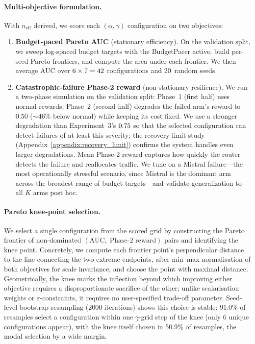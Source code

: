 \paragraph{Multi-objective formulation.}
With $n_{\text{eff}}$ derived, we score each $(\alpha, \gamma)$
configuration on two objectives:
%
\begin{enumerate}[nosep,leftmargin=*]
  \item \textbf{Budget-paced Pareto AUC} (stationary efficiency).
    On the validation split, we sweep log-spaced budget targets with
    the BudgetPacer active, build per-seed Pareto frontiers, and
    compute the area under each frontier.
    We then average AUC over
    $6 \times 7 = 42$ configurations and
    20~random seeds.

  \item \textbf{Catastrophic-failure Phase-2 reward} (non-stationary
    resilience).
    We run a two-phase simulation on the validation split: Phase~1
    (first half) uses normal rewards; Phase~2 (second half) degrades
    the failed arm's reward to $0.50$ (${\sim}46$\% below normal)
    while keeping its cost fixed.
    We use a stronger degradation than Experiment~3's
    $0.75$ so that the selected configuration can detect
    failures of at least this severity; the recovery-limit study
    (Appendix~\ref{appendix:recovery_limit}) confirms the system
    handles even larger degradations.
    Mean Phase-2 reward captures how quickly the router detects the
    failure and reallocates traffic.
    We tune on a Mistral failure---the most operationally stressful
    scenario, since Mistral is the dominant arm across the broadest
    range of budget targets---and validate generalization to all $K$
    arms post hoc.
\end{enumerate}

\paragraph{Pareto knee-point selection.}
We select a single configuration from the scored grid by
constructing the Pareto frontier of non-dominated
$(\text{AUC},\;\text{Phase-2 reward})$ pairs and identifying
the knee point.
Concretely, we compute each frontier point's perpendicular
distance to the line connecting the two extreme endpoints, after
min--max normalisation of both objectives for scale invariance,
and choose the point with maximal distance.
Geometrically, the knee marks the inflection beyond which
improving either objective requires a disproportionate sacrifice
of the other; unlike scalarisation weights or
$\varepsilon$-constraints, it requires no user-specified trade-off
parameter.
Seed-level bootstrap resampling (2000 iterations) shows this
choice is stable: 91.0\% of resamples select a configuration
within one $\gamma$-grid step of the knee (only 6 unique
configurations appear), with the knee itself chosen in 50.9\% of
resamples, the modal selection by a wide margin.

